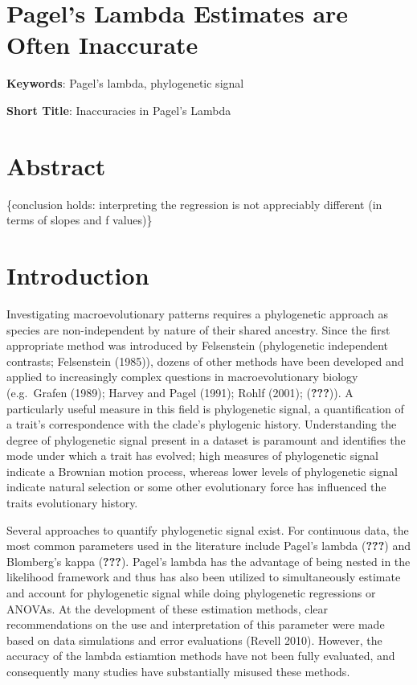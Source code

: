 \documentclass[
]{article}
\author{}
\date{\vspace{-2.5em}}
\begin{document}
\hypertarget{pagels-lambda-estimates-are-often-inaccurate}{%
\section{Pagel's Lambda Estimates are Often
Inaccurate}\label{pagels-lambda-estimates-are-often-inaccurate}}

\hfill\break

\textbf{Keywords}: Pagel's lambda, phylogenetic signal \hfill\break

\textbf{Short Title}: Inaccuracies in Pagel's Lambda \hfill\break

\hypertarget{abstract}{%
\section{Abstract}\label{abstract}}

\{conclusion holds: interpreting the regression is not appreciably
different (in terms of slopes and f values)\}

\newpage

\hypertarget{introduction}{%
\section{Introduction}\label{introduction}}

Investigating macroevolutionary patterns requires a phylogenetic
approach as species are non-independent by nature of their shared
ancestry. Since the first appropriate method was introduced by
Felsenstein (phylogenetic independent contrasts; Felsenstein (1985)),
dozens of other methods have been developed and applied to increasingly
complex questions in macroevolutionary biology (e.g.~Grafen (1989);
Harvey and Pagel (1991); Rohlf (2001); ({\textbf{???}})). A particularly
useful measure in this field is phylogenetic signal, a quantification of
a trait's correspondence with the clade's phylogenic history.
Understanding the degree of phylogenetic signal present in a dataset is
paramount and identifies the mode under which a trait has evolved; high
measures of phylogenetic signal indicate a Brownian motion process,
whereas lower levels of phylogenetic signal indicate natural selection
or some other evolutionary force has influenced the traits evolutionary
history. \hfill\break

Several approaches to quantify phylogenetic signal exist. For continuous
data, the most common parameters used in the literature include Pagel's
lambda ({\textbf{???}}) and Blomberg's kappa ({\textbf{???}}). Pagel's
lambda has the advantage of being nested in the likelihood framework and
thus has also been utilized to simultaneously estimate and account for
phylogenetic signal while doing phylogenetic regressions or ANOVAs. At
the development of these estimation methods, clear recommendations on
the use and interpretation of this parameter were made based on data
simulations and error evaluations (Revell 2010). However, the accuracy
of the lambda estiamtion methods have not been fully evaluated, and
consequently many studies have substantially misused these methods.
\hfill\break
\end{document}
